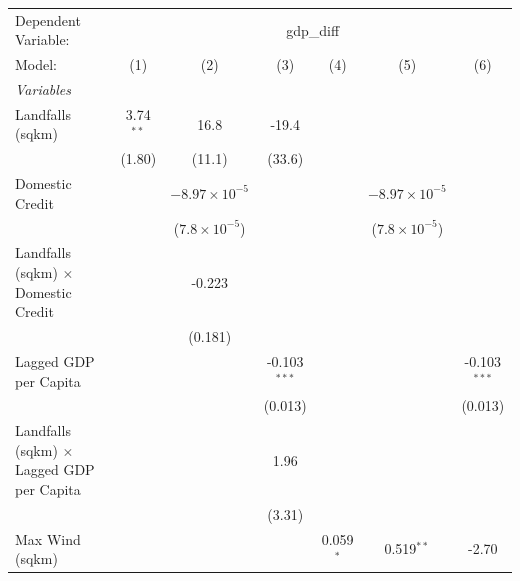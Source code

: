 
\begingroup
\centering
\begin{tabular}{lcccccc}
   \tabularnewline \midrule \midrule
   Dependent Variable: & \multicolumn{6}{c}{gdp\_diff}\\
   Model:                                           & (1)         & (2)                    & (3)            & (4)         & (5)                    & (6)\\  
   \midrule
   \emph{Variables}\\
   Landfalls (sqkm)                                 & 3.74$^{**}$ & 16.8                   & -19.4          &             &                        &   \\   
                                                    & (1.80)      & (11.1)                 & (33.6)         &             &                        &   \\   
   Domestic Credit                                  &             & $-8.97\times 10^{-5}$  &                &             & $-8.97\times 10^{-5}$  &   \\   
                                                    &             & ($7.8\times 10^{-5}$)  &                &             & ($7.8\times 10^{-5}$)  &   \\   
   Landfalls (sqkm) $\times$ Domestic Credit        &             & -0.223                 &                &             &                        &   \\   
                                                    &             & (0.181)                &                &             &                        &   \\   
   Lagged GDP per Capita                            &             &                        & -0.103$^{***}$ &             &                        & -0.103$^{***}$\\   
                                                    &             &                        & (0.013)        &             &                        & (0.013)\\   
   Landfalls (sqkm) $\times$ Lagged GDP per Capita  &             &                        & 1.96           &             &                        &   \\   
                                                    &             &                        & (3.31)         &             &                        &   \\   
   Max Wind (sqkm)                                  &             &                        &                & 0.059$^{*}$ & 0.519$^{**}$           & -2.70\\   

\end{tabular}
